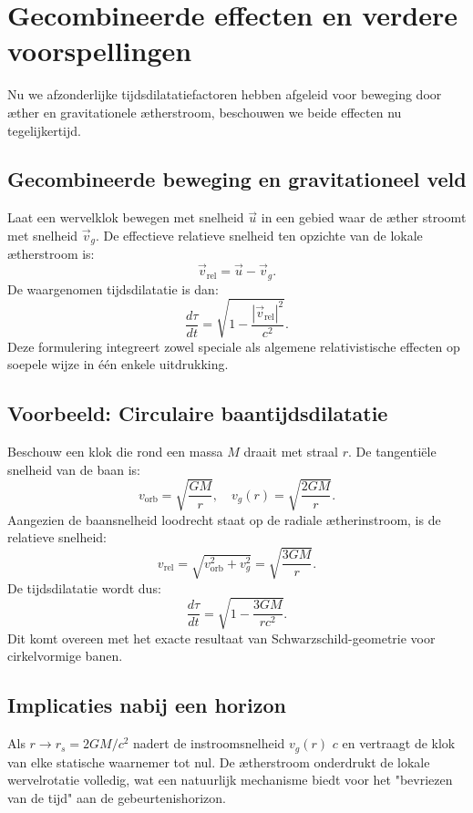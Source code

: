 \section{Gecombineerde effecten en verdere voorspellingen}

Nu we afzonderlijke tijdsdilatatiefactoren hebben afgeleid voor beweging door æther en gravitationele ætherstroom, beschouwen we beide effecten nu tegelijkertijd.

\subsection*{Gecombineerde beweging en gravitationeel veld}

Laat een wervelklok bewegen met snelheid $\vec{u}$ in een gebied waar de æther stroomt met snelheid $\vec{v}_g$. De effectieve relatieve snelheid ten opzichte van de lokale ætherstroom is:
\[
    \vec{v}_{\text{rel}} = \vec{u} - \vec{v}_g.
\]
De waargenomen tijdsdilatatie is dan:
\[
    \frac{d\tau}{dt} = \sqrt{1 - \frac{|\vec{v}_{\text{rel}}|^2}{c^2}}. \tag{5}
\]
Deze formulering integreert zowel speciale als algemene relativistische effecten op soepele wijze in één enkele uitdrukking.

\subsection*{Voorbeeld: Circulaire baantijdsdilatatie}

Beschouw een klok die rond een massa $M$ draait met straal $r$. De tangentiële snelheid van de baan is:
\[
    v_{\text{orb}} = \sqrt{\frac{GM}{r}}, \quad v_g(r) = \sqrt{\frac{2GM}{r}}.
\]
Aangezien de baansnelheid loodrecht staat op de radiale ætherinstroom, is de relatieve snelheid:
\[
    v_{\text{rel}} = \sqrt{v_{\text{orb}}^2 + v_g^2} = \sqrt{\frac{3GM}{r}}. \]
De tijdsdilatatie wordt dus:
\[
    \frac{d\tau}{dt} = \sqrt{1 - \frac{3GM}{rc^2}}. \tag{6}
\]
Dit komt overeen met het exacte resultaat van Schwarzschild-geometrie voor cirkelvormige banen.

\subsection*{Implicaties nabij een horizon}

Als $r \to r_s = 2GM/c^2$ nadert de instroomsnelheid $v_g(r)$ $c$ en vertraagt de klok van elke statische waarnemer tot nul. De ætherstroom onderdrukt de lokale wervelrotatie volledig, wat een natuurlijk mechanisme biedt voor het "bevriezen van de tijd" aan de gebeurtenishorizon.

